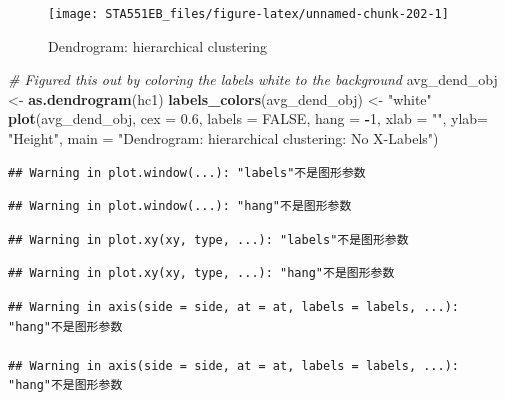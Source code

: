 \documentclass[
]{book}
\newenvironment{Shaded}{\begin{snugshade}}{\end{snugshade}}
\newcommand{\AttributeTok}[1]{\textcolor[rgb]{0.13,0.29,0.53}{#1}}
\newcommand{\CommentTok}[1]{\textcolor[rgb]{0.56,0.35,0.01}{\textit{#1}}}
\newcommand{\ConstantTok}[1]{\textcolor[rgb]{0.56,0.35,0.01}{#1}}
\newcommand{\DecValTok}[1]{\textcolor[rgb]{0.00,0.00,0.81}{#1}}
\newcommand{\FloatTok}[1]{\textcolor[rgb]{0.00,0.00,0.81}{#1}}
\newcommand{\FunctionTok}[1]{\textcolor[rgb]{0.13,0.29,0.53}{\textbf{#1}}}
\newcommand{\NormalTok}[1]{#1}
\newcommand{\OtherTok}[1]{\textcolor[rgb]{0.56,0.35,0.01}{#1}}
\newcommand{\SpecialCharTok}[1]{\textcolor[rgb]{0.81,0.36,0.00}{\textbf{#1}}}
\newcommand{\StringTok}[1]{\textcolor[rgb]{0.31,0.60,0.02}{#1}}
\begin{document}
\begin{figure}

{\centering \texttt{[image: STA551EB\_files/figure-latex/unnamed-chunk-202-1]} 

}

\caption{Dendrogram: hierarchical clustering}\label{fig:unnamed-chunk-202}
\end{figure}

\begin{Shaded}
\begin{Highlighting}[]
\CommentTok{\# Figured this out by coloring the labels white to the background}
\NormalTok{avg\_dend\_obj }\OtherTok{\textless{}{-}} \FunctionTok{as.dendrogram}\NormalTok{(hc1)}
\FunctionTok{labels\_colors}\NormalTok{(avg\_dend\_obj) }\OtherTok{\textless{}{-}} \StringTok{"white"}
\FunctionTok{plot}\NormalTok{(avg\_dend\_obj, }\AttributeTok{cex =} \FloatTok{0.6}\NormalTok{, }
     \AttributeTok{labels =} \ConstantTok{FALSE}\NormalTok{, }
     \AttributeTok{hang =} \SpecialCharTok{{-}}\DecValTok{1}\NormalTok{, }
     \AttributeTok{xlab =} \StringTok{""}\NormalTok{, }
     \AttributeTok{ylab=} \StringTok{"Height"}\NormalTok{,}
     \AttributeTok{main =} \StringTok{"Dendrogram: hierarchical clustering: No X{-}Labels"}\NormalTok{)}
\end{Highlighting}
\end{Shaded}

\begin{verbatim}
## Warning in plot.window(...): "labels"不是图形参数
\end{verbatim}

\begin{verbatim}
## Warning in plot.window(...): "hang"不是图形参数
\end{verbatim}

\begin{verbatim}
## Warning in plot.xy(xy, type, ...): "labels"不是图形参数
\end{verbatim}

\begin{verbatim}
## Warning in plot.xy(xy, type, ...): "hang"不是图形参数
\end{verbatim}

\begin{verbatim}
## Warning in axis(side = side, at = at, labels = labels, ...): "hang"不是图形参数

## Warning in axis(side = side, at = at, labels = labels, ...): "hang"不是图形参数
\end{verbatim}
\end{document}
